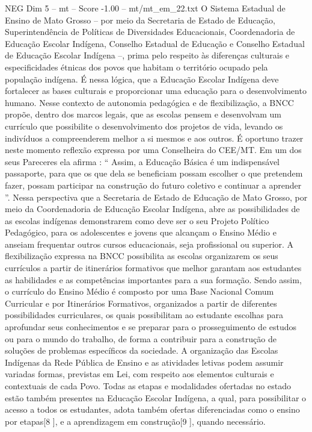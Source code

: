 \begin{textsample}{NEG Dim 5 – mt – Score -1.00 – mt/mt\_em\_22.txt}
O Sistema Estadual de Ensino de Mato Grosso – por meio da Secretaria de Estado de Educação, Superintendência de Políticas de Diversidades Educacionais, Coordenadoria de Educação Escolar Indígena, Conselho Estadual de Educação e Conselho Estadual de Educação Escolar Indígena –, prima pelo respeito às diferenças culturais e especificidades étnicas dos povos que habitam o território ocupado pela população indígena.
É nessa lógica, que a Educação Escolar Indígena deve fortalecer as bases culturais e proporcionar uma educação para o desenvolvimento humano.
Nesse contexto de autonomia pedagógica e de flexibilização, a BNCC propõe, dentro dos marcos legais, que as escolas pensem e desenvolvam um currículo que possibilite o desenvolvimento dos projetos de vida, levando os indivíduos a compreenderem melhor a si mesmos e aos outros.
É oportuno trazer neste momento reflexão expressa por uma Conselheira do CEE/MT.
Em um dos seus Pareceres ela afirma : “ Assim, a Educação Básica é um indispensável passaporte, para que os que dela se beneficiam possam escolher o que pretendem fazer, possam participar na construção do futuro coletivo e continuar a aprender ”.
Nessa perspectiva que a Secretaria de Estado de Educação de Mato Grosso, por meio da Coordenadoria de Educação Escolar Indígena, abre as possibilidades de as escolas indígenas demonstrarem como deve ser o seu Projeto Político Pedagógico, para os adolescentes e jovens que alcançam o Ensino Médio e anseiam frequentar outros cursos educacionais, seja profissional ou superior.
A flexibilização expressa na BNCC possibilita as escolas organizarem os seus currículos a partir de itinerários formativos que melhor garantam aos estudantes as habilidades e as competências importantes para a sua formação.
Sendo assim, o currículo do Ensino Médio é composto por uma Base Nacional Comum Curricular e por Itinerários Formativos, organizados a partir de diferentes possibilidades curriculares, os quais possibilitam ao estudante escolhas para aprofundar seus conhecimentos e se preparar para o prosseguimento de estudos ou para o mundo do trabalho, de forma a contribuir para a construção de soluções de problemas específicos da sociedade.
A organização das Escolas Indígenas da Rede Pública de Ensino e as atividades letivas podem assumir variadas formas, previstas em Lei, com respeito aos elementos culturais e contextuais de cada Povo.
Todas as etapas e modalidades ofertadas no estado estão também presentes na Educação Escolar Indígena, a qual, para possibilitar o acesso a todos os estudantes, adota também ofertas diferenciadas como o ensino por etapas[8 ], e a aprendizagem em construção[9 ], quando necessário.

\end{textsample}
